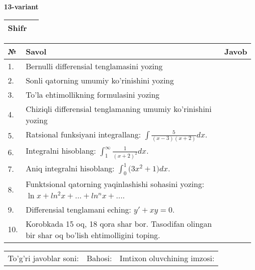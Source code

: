 \documentclass{article}
\begin{document}
  \egroup
  
  \newpage
  
  
  \textbf{13-variant}\\
  
  \bgroup
  \def\arraystretch{1.6} %
  
  \begin{tabular}{|m{5.7cm}|m{9.5cm}|}
  \hline
  Shifr & \\
  \hline
  \end{tabular}
  
  \vspace{1cm}
  
  \begin{tabular}{|m{0.7cm}|m{10cm}|m{4cm}|}
  \hline
  № & Savol & Javob \\
  \hline
  1. & Bernulli differensial tenglamasini yozing &  \\
  \hline
  2. & Sonli qatorning umumiy ko'rinishini yozing &  \\
  \hline
  3. & To'la ehtimollikning formulasini yozing &  \\
  \hline
  4. & Chiziqli differensial tenglamaning umumiy ko'rinishini yozing &  \\
  \hline
  5. & Ratsional funksiyani integrallang: \(\int {\frac{5}{(x - 3)(x + 2)}dx}\). &  \\
  \hline
  6. & Integralni hisoblang: \(\int_{1}^{\infty}{\frac{1}{(x + 2)^{2}}dx}\). &  \\
  \hline
  7. & Aniq integralni hisoblang: \(\int_{0}^{1}{(3x^{2}} + 1)dx\). &  \\
  \hline
  8. & Funktsional qatorning yaqinlashishi sohasini yozing: \(\ln x + ln^{2}x + ... + ln^{n}x + ...\). &  \\
  \hline
  9. & Differensial tenglamani eching: \(y' + xy = 0\). &  \\
  \hline
  10. & Korobkada 15 oq, 18 qora shar bor. Tasodifan olingan bir shar oq bo'lish ehtimolligini toping. &  \\
  \hline
  \end{tabular}
  
  \vspace{1cm}
  
  \begin{tabular}{lll}
  To'g'ri javoblar soni: \underline{\hspace{1.5cm}} & 
  Bahosi: \underline{\hspace{1.5cm}} & 
  Imtixon oluvchining imzosi: \underline{\hspace{2cm}} \\
  \end{tabular}
  
\end{document}
